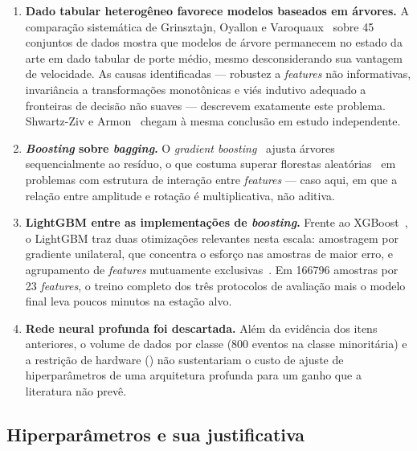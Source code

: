 \begin{enumerate}
  \item \textbf{Dado tabular heterogêneo favorece modelos baseados em
    árvores.} A comparação sistemática de Grinsztajn, Oyallon e
    Varoquaux~\cite{grinsztajn2022tree} sobre 45 conjuntos de dados mostra que
    modelos de árvore permanecem no estado da arte em dado tabular de porte
    médio, mesmo desconsiderando sua vantagem de velocidade. As causas
    identificadas --- robustez a \textit{features} não informativas,
    invariância a transformações monotônicas e viés indutivo adequado a
    fronteiras de decisão não suaves --- descrevem exatamente este problema.
    Shwartz-Ziv e Armon~\cite{shwartzziv2022tabular} chegam à mesma conclusão
    em estudo independente.

  \item \textbf{\textit{Boosting} sobre \textit{bagging}.} O
    \textit{gradient boosting}~\cite{friedman2001greedy} ajusta árvores
    sequencialmente ao resíduo, o que costuma superar florestas
    aleatórias~\cite{breiman2001random} em problemas com estrutura de
    interação entre \textit{features} --- caso aqui, em que a relação entre
    amplitude e rotação é multiplicativa, não aditiva.

  \item \textbf{LightGBM entre as implementações de \textit{boosting}.}
    Frente ao XGBoost~\cite{chen2016xgboost}, o LightGBM traz duas
    otimizações relevantes nesta escala: amostragem por gradiente unilateral,
    que concentra o esforço nas amostras de maior erro, e agrupamento de
    \textit{features} mutuamente exclusivas~\cite{ke2017lightgbm}. Em
    \num{166796} amostras por 23 \textit{features}, o treino completo dos três
    protocolos de avaliação mais o modelo final leva poucos minutos na estação
    alvo.

  \item \textbf{Rede neural profunda foi descartada.} Além da evidência dos
    itens anteriores, o volume de dados por classe (\num{800} eventos na classe
    minoritária) e a restrição de hardware () não sustentariam o
    custo de ajuste de hiperparâmetros de uma arquitetura profunda para um
    ganho que a literatura não prevê.
\end{enumerate}

\subsection{Hiperparâmetros e sua justificativa}

